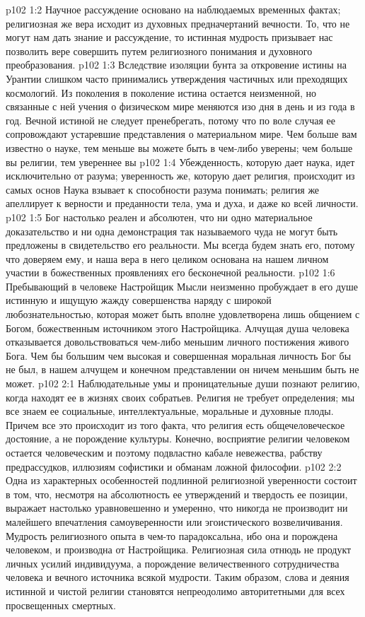 \vs p102 1:2 Научное рассуждение основано на наблюдаемых временных фактах; религиозная же вера исходит из духовных предначертаний вечности. То, что не могут нам дать знание и рассуждение, то истинная мудрость призывает нас позволить вере совершить путем религиозного понимания и духовного преобразования.
\vs p102 1:3 Вследствие изоляции бунта за откровение истины на Урантии слишком часто принимались утверждения частичных или преходящих космологий. Из поколения в поколение истина остается неизменной, но связанные с ней учения о физическом мире меняются изо дня в день и из года в год. Вечной истиной не следует пренебрегать, потому что по воле случая ее сопровождают устаревшие представления о материальном мире. Чем больше вам известно о науке, тем меньше вы можете быть в чем\hyp{}либо уверены; чем больше  вы религии, тем увереннее вы
\vs p102 1:4 Убежденность, которую дает наука, идет исключительно от разума; уверенность же, которую дает религия, происходит из самых основ  Наука взывает к способности разума понимать; религия же апеллирует к верности и преданности тела, ума и духа, и даже ко всей личности.
\vs p102 1:5 \pc Бог настолько реален и абсолютен, что ни одно материальное доказательство и ни одна демонстрация так называемого чуда не могут быть предложены в свидетельство его реальности. Мы всегда будем знать его, потому что доверяем ему, и наша вера в него целиком основана на нашем личном участии в божественных проявлениях его бесконечной реальности.
\vs p102 1:6 \pc Пребывающий в человеке Настройщик Мысли неизменно пробуждает в его душе истинную и ищущую жажду совершенства наряду с широкой любознательностью, которая может быть вполне удовлетворена лишь общением с Богом, божественным источником этого Настройщика. Алчущая душа человека отказывается довольствоваться чем\hyp{}либо меньшим личного постижения живого Бога. Чем бы большим чем высокая и совершенная моральная личность Бог бы не был, в нашем алчущем и конечном представлении он ничем меньшим быть не может.
\vs p102 2:1 Наблюдательные умы и проницательные души познают религию, когда находят ее в жизнях своих собратьев. Религия не требует определения; мы все знаем ее социальные, интеллектуальные, моральные и духовные плоды. Причем все это происходит из того факта, что религия есть общечеловеческое достояние, а не порождение культуры. Конечно, восприятие религии человеком остается человеческим и поэтому подвластно кабале невежества, рабству предрассудков, иллюзиям софистики и обманам ложной философии.
\vs p102 2:2 Одна из характерных особенностей подлинной религиозной уверенности состоит в том, что, несмотря на абсолютность ее утверждений и твердость ее позиции, выражает настолько уравновешенно и умеренно, что никогда не производит ни малейшего впечатления самоуверенности или эгоистического возвеличивания. Мудрость религиозного опыта в чем\hyp{}то парадоксальна, ибо она и порождена человеком, и производна от Настройщика. Религиозная сила отнюдь не продукт личных усилий индивидуума, а порождение величественного сотрудничества человека и вечного источника всякой мудрости. Таким образом, слова и деяния истинной и чистой религии становятся непреодолимо авторитетными для всех просвещенных смертных.
